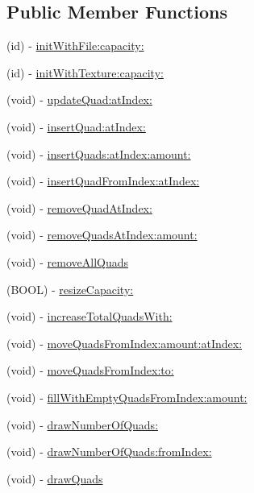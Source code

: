 \subsection*{Public Member Functions}
\begin{DoxyCompactItemize}
\item 
(id) -\/ \hyperlink{interface_c_c_texture_atlas_a79eb5e092a5fd60b4ae14443f0e0accd}{init\-With\-File\-:capacity\-:}
\item 
(id) -\/ \hyperlink{interface_c_c_texture_atlas_a116112403fa866d6f835a24548c4aeb3}{init\-With\-Texture\-:capacity\-:}
\item 
(void) -\/ \hyperlink{interface_c_c_texture_atlas_a61958a6c7e41aea2343bb15b0a496e62}{update\-Quad\-:at\-Index\-:}
\item 
(void) -\/ \hyperlink{interface_c_c_texture_atlas_a8839e1d637bba0bf16aee4610f2eb875}{insert\-Quad\-:at\-Index\-:}
\item 
(void) -\/ \hyperlink{interface_c_c_texture_atlas_a307868eb479a76dea8d07c8b3fb61ef4}{insert\-Quads\-:at\-Index\-:amount\-:}
\item 
(void) -\/ \hyperlink{interface_c_c_texture_atlas_abe58cba5d570d9b1d9d96fe018d986c8}{insert\-Quad\-From\-Index\-:at\-Index\-:}
\item 
(void) -\/ \hyperlink{interface_c_c_texture_atlas_adc1f3102fa3195facfc0ce79c56526ee}{remove\-Quad\-At\-Index\-:}
\item 
(void) -\/ \hyperlink{interface_c_c_texture_atlas_a9a44172cc26bd01f0d89cec31fd4125a}{remove\-Quads\-At\-Index\-:amount\-:}
\item 
(void) -\/ \hyperlink{interface_c_c_texture_atlas_ab070b61f1f06b67fbc544d8eefcea9c3}{remove\-All\-Quads}
\item 
(B\-O\-O\-L) -\/ \hyperlink{interface_c_c_texture_atlas_a24ebdf2f5b5f1e6f0e69e7042209d7e1}{resize\-Capacity\-:}
\item 
(void) -\/ \hyperlink{interface_c_c_texture_atlas_a356fd456edd24e6b6f7fc1111e1e8ed8}{increase\-Total\-Quads\-With\-:}
\item 
(void) -\/ \hyperlink{interface_c_c_texture_atlas_a1a8c0bde07e4185b2333dc8b253d9a6a}{move\-Quads\-From\-Index\-:amount\-:at\-Index\-:}
\item 
(void) -\/ \hyperlink{interface_c_c_texture_atlas_a673bcc26369870c2739da0d359ef96aa}{move\-Quads\-From\-Index\-:to\-:}
\item 
(void) -\/ \hyperlink{interface_c_c_texture_atlas_aed3b44b698beb1497602163694712a67}{fill\-With\-Empty\-Quads\-From\-Index\-:amount\-:}
\item 
(void) -\/ \hyperlink{interface_c_c_texture_atlas_a0430a5419364da046889f5ee27a27776}{draw\-Number\-Of\-Quads\-:}
\item 
(void) -\/ \hyperlink{interface_c_c_texture_atlas_acfd516770d517d8f674fe01b66423ec2}{draw\-Number\-Of\-Quads\-:from\-Index\-:}
\item 
(void) -\/ \hyperlink{interface_c_c_texture_atlas_ae593ef56a628f6148223aa56fe94cdc7}{draw\-Quads}
\end{DoxyCompactItemize}
